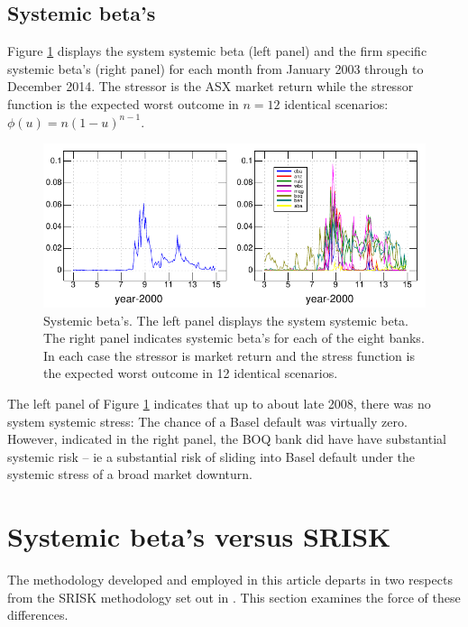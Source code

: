 \documentclass[authoryear]{elsarticle}
\newcommand{\fref}[1]{Figure \ref{#1}}
\begin{document}
\subsection{Systemic beta's}

\fref{Bbeta} displays the system systemic beta (left panel) and the firm specific systemic beta's (right panel)  for each month from January 2003 through to December 2014.   The stressor is the ASX market return while the stressor function is the expected worst outcome in $n=12$ identical scenarios:  $\phi(u)=n(1-u)^{n-1}$.

\begin{figure}[htbp]
\begin{center}
\includegraphics{Bbeta.pdf}
\caption{Systemic beta's.  The left panel displays the system systemic beta.   The right panel indicates systemic beta's for each of the eight banks.  In each case the stressor is market return and the stress function is the expected worst outcome in 12 identical scenarios.}
\label{Bbeta}
\end{center}
\end{figure}

The left panel of \fref{Bbeta} indicates that up to about late 2008, there was no system systemic stress:  The chance of a Basel default was virtually zero.   However, indicated in the right panel, the BOQ bank did have have substantial systemic risk -- ie a substantial risk of sliding into Basel default under the systemic stress of a broad market downturn.

\section{Systemic beta's  versus SRISK}

The methodology developed and employed in this article departs in two respects from the SRISK methodology set out in \cite{brownlees2015}.  This section examines the force of these differences.
\end{document}
